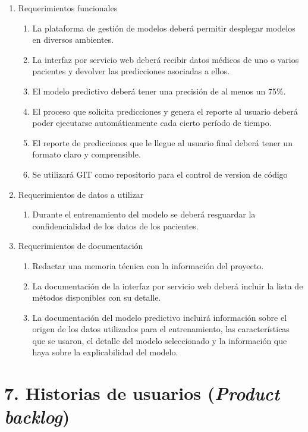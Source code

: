\documentclass[
11pt, %
]{charter}
\begin{document}
\begin{enumerate}
	\item Requerimientos funcionales
		\begin{enumerate}
			\item La plataforma de gestión de modelos deberá permitir desplegar modelos en diversos ambientes.
			\item La interfaz por servicio web deberá recibir datos médicos de uno o varios pacientes y devolver las predicciones asociadas a ellos.			
			\item El modelo predictivo deberá tener una precisión de al menos un 75\%.
			\item El proceso que solicita predicciones y genera el reporte al usuario deberá poder ejecutarse automáticamente cada cierto período de tiempo.		
			\item El reporte de predicciones que le llegue al usuario final deberá tener un formato claro y comprensible.
			\item Se utilizará GIT como repositorio para el control de version de código
		\end{enumerate}
	\item Requerimientos de datos a utilizar
		\begin{enumerate}		
		\item Durante el entrenamiento del modelo se deberá resguardar la confidencialidad de los datos de los pacientes.		
		\end{enumerate}
	\item Requerimientos de documentación
		\begin{enumerate}
			\item Redactar una memoria técnica con la información del proyecto.
			\item La documentación de la interfaz por servicio web deberá incluir la lista de métodos disponibles con su detalle.
			\item La documentación del modelo predictivo incluirá información sobre el origen de los datos utilizados para el entrenamiento, las características que se usaron, el detalle del modelo seleccionado y la información que haya sobre la explicabilidad del modelo.
		\end{enumerate}		
\end{enumerate}

\section{7. Historias de usuarios (\textit{Product backlog})}
\label{sec:backlog}
\end{document}
